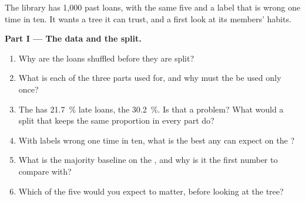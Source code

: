 \begin{problem}\label{pb:b2:trees-and-clustering:1}
The library has 1,000 past loans, with the same five  and a label that is wrong one time in ten. It wants a
tree it can trust, and a first look at its members' habits.

\label{lst:b2:trees-and-clustering:problem}

\label{out:b2:trees-and-clustering:problem}

\medskip\noindent\textbf{Part I --- The data and the split.}\par\nopagebreak
\begin{enumerate}
\item Why are the loans shuffled before they are split?
\item What is each of the three parts used for, and why must the  be used only once?
\item The  has 21.7~\% late loans, the  30.2~\%. Is that a problem? What would a split that keeps the
same proportion in every part do?
\item With labels wrong one time in ten, what is the best  any  can expect on the ?
\item What is the majority baseline on the , and why is it the first number to compare with?
\item Which of the five  would you expect to matter, before looking at the tree?
\end{enumerate}


\end{problem}
